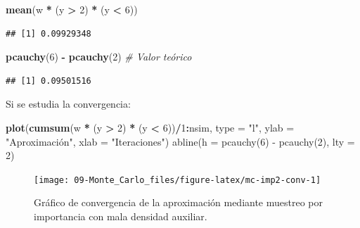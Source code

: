 \documentclass[
]{book}
\newenvironment{Shaded}{\begin{snugshade}}{\end{snugshade}}
\newcommand{\CommentTok}[1]{\textcolor[rgb]{0.56,0.35,0.01}{\textit{#1}}}
\newcommand{\DataTypeTok}[1]{\textcolor[rgb]{0.13,0.29,0.53}{#1}}
\newcommand{\DecValTok}[1]{\textcolor[rgb]{0.00,0.00,0.81}{#1}}
\newcommand{\KeywordTok}[1]{\textcolor[rgb]{0.13,0.29,0.53}{\textbf{#1}}}
\newcommand{\NormalTok}[1]{#1}
\newcommand{\OperatorTok}[1]{\textcolor[rgb]{0.81,0.36,0.00}{\textbf{#1}}}
\newcommand{\StringTok}[1]{\textcolor[rgb]{0.31,0.60,0.02}{#1}}
\theoremstyle{break}
\theoremstyle{definition}
\theoremstyle{definition}
\theoremstyle{definition}
\theoremstyle{remark}
\begin{document}
\begin{Shaded}
\begin{Highlighting}[]
\KeywordTok{mean}\NormalTok{(w }\OperatorTok{*}\StringTok{ }\NormalTok{(y }\OperatorTok{>}\StringTok{ }\DecValTok{2}\NormalTok{) }\OperatorTok{*}\StringTok{ }\NormalTok{(y }\OperatorTok{<}\StringTok{ }\DecValTok{6}\NormalTok{)) }
\end{Highlighting}
\end{Shaded}

\begin{verbatim}
## [1] 0.09929348
\end{verbatim}

\begin{Shaded}
\begin{Highlighting}[]
\KeywordTok{pcauchy}\NormalTok{(}\DecValTok{6}\NormalTok{) }\OperatorTok{-}\StringTok{ }\KeywordTok{pcauchy}\NormalTok{(}\DecValTok{2}\NormalTok{)  }\CommentTok{# Valor teórico}
\end{Highlighting}
\end{Shaded}

\begin{verbatim}
## [1] 0.09501516
\end{verbatim}

Si se estudia la convergencia:

\begin{Shaded}
\begin{Highlighting}[]
\KeywordTok{plot}\NormalTok{(}\KeywordTok{cumsum}\NormalTok{(w }\OperatorTok{*}\StringTok{ }\NormalTok{(y }\OperatorTok{>}\StringTok{ }\DecValTok{2}\NormalTok{) }\OperatorTok{*}\StringTok{ }\NormalTok{(y }\OperatorTok{<}\StringTok{ }\DecValTok{6}\NormalTok{))}\OperatorTok{/}\DecValTok{1}\OperatorTok{:}\NormalTok{nsim, }\DataTypeTok{type =} \StringTok{"l"}\NormalTok{, }\DataTypeTok{ylab =} \StringTok{"Aproximación", xlab = "}\NormalTok{Iteraciones}\StringTok{")}
\StringTok{abline(h = pcauchy(6) - pcauchy(2), lty = 2)}
\end{Highlighting}
\end{Shaded}

\begin{figure}[!htb]

{\centering \texttt{[image: 09-Monte\_Carlo\_files/figure-latex/mc-imp2-conv-1]} 

}

\caption{Gráfico de convergencia de la aproximación mediante muestreo por importancia con mala densidad auxiliar.}\label{fig:mc-imp2-conv}
\end{figure}
\end{document}
